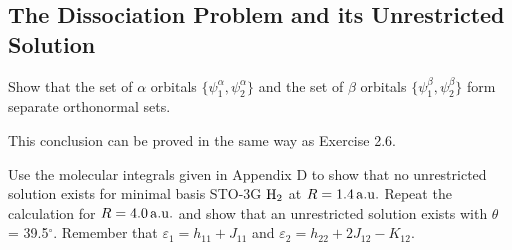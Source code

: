\documentclass[a4paper]{book}
\newcounter{exercise}[chapter]
\newcounter{solution}[chapter]
\newcommand{\au}{{\rm a.u.}}
\begin{document}
	\subsection{The Dissociation Problem and its Unrestricted Solution}
	
	\begin{exercise}
	Show that the set of $\alpha$ orbitals $\{ \psi^\alpha_1 , \psi^\alpha_2 \}$ and the set of $\beta$ orbitals $\{ \psi^\beta_1 , \psi^\beta_2 \}$ form separate orthonormal sets.
	\end{exercise}
	
	\begin{solution}
	This conclusion can be proved in the same way as Exercise 2.6.
	\end{solution}
	
	\begin{exercise}
	Use the molecular integrals given in Appendix D to show that no unrestricted solution exists for minimal basis STO-3G $\ce{H2}$ at $R = 1.4 \, \au$ Repeat the calculation for $R = 4.0 \, \au$ and show that an unrestricted solution exists with $\theta$ = 39.5${}^\circ$. Remember that $\varepsilon_1 = h_{11} + J_{11}$ and $\varepsilon_2 = h_{22} + 2 J_{12} - K_{12}$.
	\end{exercise}
	
\end{document}
